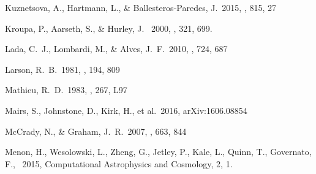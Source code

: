 \begin{thebibliography}
 Kuznetsova, A., Hartmann, L., \& Ballesteros-Paredes, J.\ 2015, \apj, 815, 27 

 Kroupa, P., Aarseth, S., \& Hurley, J. \ 2000, \mnras, 321, 699. 



 Lada, C.~J., Lombardi, M.,
\& Alves, J.~F.\ 2010, \apj, 724, 687

 Larson, R.~B.\ 1981, \mnras, 194, 809




 Mathieu, R.~D.\ 1983, \apjl, 
267, L97 

 Mairs, S., Johnstone, D., Kirk, H., et al.\ 2016, arXiv:1606.08854 

 McCrady, N., \& Graham, J.~R.\ 2007, \apj, 663, 844 











 Menon, H., Wesolowski, L., Zheng, G., Jetley, P., Kale, L., Quinn, T., Governato, F., \ 2015, Computational Astrophysics and Cosmology, 2, 1.


\end{thebibliography}
